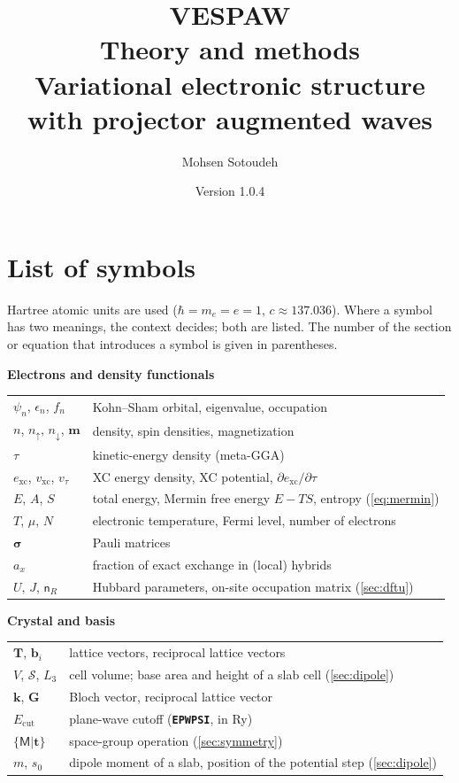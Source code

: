 \documentclass[11pt,a4paper,oneside]{book}
\title{\Huge\bfseries VESPAW\\[0.6em]\LARGE Theory and methods\\[2em]
\normalsize Variational electronic structure with projector augmented waves}
\author{Mohsen Sotoudeh}
\date{Version 1.0.4}
\newcommand{\key}[1]{\textbf{\texttt{#1}}}
\begin{document}
\dominitoc
\frontmatter
\maketitle
\tableofcontents

\chapter*{List of symbols}

Hartree atomic units are used ($\hbar=m_e=e=1$, $c\approx137.036$).
Where a symbol has two meanings, the context decides; both are listed.
The number of the section or equation that introduces a symbol is given in parentheses.

\newcommand{\symgroup}[1]{\par\medskip\noindent\textbf{#1}\par\nopagebreak\smallskip\nopagebreak}
\newenvironment{symtab}{\noindent\begin{tabular}{@{}p{3.3cm}p{11.2cm}@{}}}{\end{tabular}\par}

\symgroup{Electrons and density functionals}
\begin{symtab}
$\psi_n$, $\epsilon_n$, $f_n$ & Kohn--Sham orbital, eigenvalue, occupation \\
$n$, $n_\uparrow$, $n_\downarrow$, $\bm m$ & density, spin densities, magnetization \\
$\tau$ & kinetic-energy density (meta-GGA) \\
$e_{\mathrm{xc}}$, $v_{\mathrm{xc}}$, $v_\tau$ & XC energy density, XC potential, $\partial e_{\mathrm{xc}}/\partial\tau$ \\
$E$, $A$, $S$ & total energy, Mermin free energy $E-TS$, entropy (\ref{eq:mermin}) \\
$T$, $\mu$, $N$ & electronic temperature, Fermi level, number of electrons \\
$\bm\sigma$ & Pauli matrices \\
$a_x$ & fraction of exact exchange in (local) hybrids \\
$U$, $J$, $\mathsf n_R$ & Hubbard parameters, on-site occupation matrix (\ref{sec:dftu}) \\
\end{symtab}

\symgroup{Crystal and basis}
\begin{symtab}
$\bm T$, $\bm b_i$ & lattice vectors, reciprocal lattice vectors \\
$V$, $\mathcal S$, $L_3$ & cell volume; base area and height of a slab cell (\ref{sec:dipole}) \\
$\bm k$, $\bm G$ & Bloch vector, reciprocal lattice vector \\
$E_{\mathrm{cut}}$ & plane-wave cutoff (\key{EPWPSI}, in Ry) \\
$\{\mathsf M|\bm t\}$ & space-group operation (\ref{sec:symmetry}) \\
$m$, $s_0$ & dipole moment of a slab, position of the potential step (\ref{sec:dipole}) \\
\end{symtab}
\end{document}

